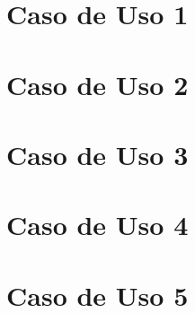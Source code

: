 \documentclass[bacharelado]{unb-cic}
\begin{document}
  \tableofcontents
  \listoffigures
  \listoftables

  \textual
  
  
  
  
  

  \appendix

  \chapter{Caso de Uso 1}\label{chapter:uc1}
  

  \chapter{Caso de Uso 2}\label{chapter:uc2}
  

  \chapter{Caso de Uso 3}\label{chapter:uc3}
  

  \chapter{Caso de Uso 4}\label{chapter:uc4}
  

  \chapter{Caso de Uso 5}\label{chapter:uc5}
  


  \postextual
  
  
\end{document}
